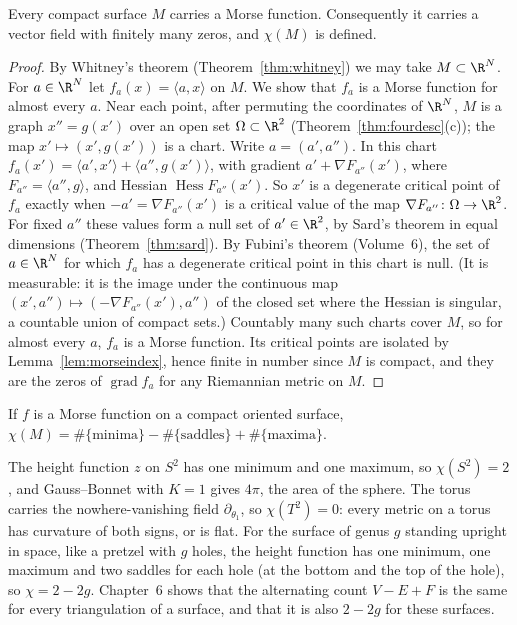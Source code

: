 \begin{theorem}\label{thm:morseexists}
Every compact surface $M$ carries a Morse function. Consequently it carries a vector field with finitely many zeros, and $\chi(M)$ is defined.
\end{theorem}
\begin{proof}
By Whitney's theorem (Theorem~\ref{thm:whitney}) we may take $M\subset\R^N$. For $a\in\R^N$ let $f_a(x)=\langle a,x\rangle$ on $M$. We show that $f_a$ is a Morse function for almost every $a$.
Near each point, after permuting the coordinates of $\R^N$, $M$ is a graph $x''=g(x')$ over an open set $\Omega\subset\R^2$ (Theorem~\ref{thm:fourdesc}(c)); the map $x'\mapsto(x',g(x'))$ is a chart.
Write $a=(a',a'')$. In this chart $f_a(x')=\langle a',x'\rangle+\langle a'',g(x')\rangle$, with gradient $a'+\nabla F_{a''}(x')$, where $F_{a''}=\langle a'',g\rangle$, and Hessian
$\operatorname{Hess}F_{a''}(x')$. So $x'$ is a degenerate critical point of $f_a$ exactly when $-a'=\nabla F_{a''}(x')$ is a critical value of the map
$\nabla F_{a''}\colon\Omega\to\R^2$. For fixed $a''$ these values form a null set of $a'\in\R^2$, by Sard's theorem in equal dimensions (Theorem~\ref{thm:sard}). By Fubini's theorem
(Volume~6), the set of $a\in\R^N$ for which $f_a$ has a degenerate critical point in this chart is null. (It is measurable: it is the image under the continuous map
$(x',a'')\mapsto(-\nabla F_{a''}(x'),a'')$ of the closed set where the Hessian is singular, a countable union of compact sets.) Countably many such charts cover $M$, so
for almost every $a$, $f_a$ is a Morse function. Its critical points are isolated by Lemma~\ref{lem:morseindex}, hence finite in number since $M$ is compact, and they are
the zeros of $\operatorname{grad}f_a$ for any Riemannian metric on $M$.
\end{proof}

\begin{corollary}\label{cor:chimorse}
If $f$ is a Morse function on a compact oriented surface, $\chi(M)=\#\{\text{minima}\}-\#\{\text{saddles}\}+\#\{\text{maxima}\}$.
\end{corollary}

\begin{example}\label{ex:chiexamples}
The height function $z$ on $S^2$ has one minimum and one maximum, so $\chi(S^2)=2$, and Gauss--Bonnet with $K=1$ gives $4\pi$, the area of the sphere. The torus
carries the nowhere-vanishing field $\partial_{\theta_1}$, so $\chi(T^2)=0$: every metric on a torus has curvature of both signs, or is flat. For the surface of genus $g$
standing upright in space, like a pretzel with $g$ holes, the height function has one minimum, one maximum and two saddles for each hole (at the bottom and
the top of the hole), so $\chi=2-2g$. Chapter~6 shows that the alternating count $V-E+F$ is the same for every triangulation of a surface, and that it is also $2-2g$ for these surfaces.
\end{example}

